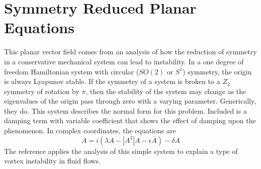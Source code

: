 \section{Symmetry Reduced Planar Equations}

This planar vector field comes from an analysis of how the reduction of
symmetry in a conservative mechanical system can lead to instability.
In a one degree of freedom Hamiltonian system with circular ($SO(2)$ or $S^1$)
symmetry, the origin is always Lyapunov stable. If the symmetry of a
system is broken to a $Z_2$ symmetry of rotation by $\pi$, then the 
stability of the system may change as the eigenvalues of the origin pass
through zero with a varying parameter. Generically, they do. This 
system describes the normal form for this problem. Included is a 
damping term with variable coefficient that shows the effect of damping
upon the phenomenon. In complex coordinates, the equations are
$$ \dot{A} = i(\lambda A - |A^2| A - \epsilon \bar{A}) - \delta A $$
The reference \cite{GuckenMahalov} applies the analysis of this simple 
system to explain a type of vortex instability in fluid flows.

